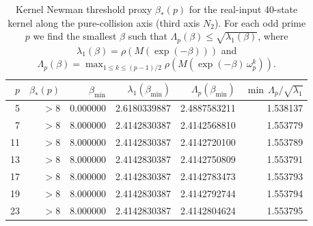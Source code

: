 \begin{table}[H]
\centering
\scriptsize
\setlength{\tabcolsep}{6pt}
\caption{Kernel Newman threshold proxy $\beta_\ast(p)$ for the real-input 40-state kernel along the pure-collision axis (third axis $N_2$). For each odd prime $p$ we find the smallest $\beta$ such that $\Lambda_p(\beta)\le \sqrt{\lambda_1(\beta)}$, where $\lambda_1(\beta)=\rho(M(\exp(-\beta)))$ and $\Lambda_p(\beta)=\max_{1\le k\le (p-1)/2}\rho(M(\exp(-\beta)\,\omega_p^k))$.}
\label{tab:real_input_40_kernel_newman_threshold}
\begin{tabular}{r r r r r r}
\toprule
$p$ & $\beta_\ast(p)$ & $\beta_{\min}$ & $\lambda_1(\beta_{\min})$ & $\Lambda_p(\beta_{\min})$ & $\min\,\Lambda_p/\sqrt{\lambda_1}$\\
\midrule
5 & $> 8$ & 0.000000 & 2.6180339887 & 2.4887583211 & 1.538137\\
7 & $> 8$ & 8.000000 & 2.4142830387 & 2.4142568810 & 1.553779\\
11 & $> 8$ & 8.000000 & 2.4142830387 & 2.4142720100 & 1.553789\\
13 & $> 8$ & 8.000000 & 2.4142830387 & 2.4142750809 & 1.553791\\
17 & $> 8$ & 8.000000 & 2.4142830387 & 2.4142783473 & 1.553793\\
19 & $> 8$ & 8.000000 & 2.4142830387 & 2.4142792744 & 1.553794\\
23 & $> 8$ & 8.000000 & 2.4142830387 & 2.4142804624 & 1.553795\\
\bottomrule
\end{tabular}
\end{table}
